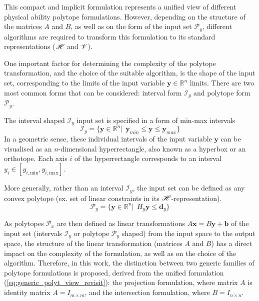 This compact and implicit formulation represents a unified view of different physical ability polytope formulations. However, depending on the structure of the matrices $A$ and $B$, as well as on the form of the input set $\mathcal{P}_y$, different algorithms are required to transform this formulation to its standard representations ($\mathscr{H}$ and $\mathscr{V}$). 

One important factor for determining the complexity of the polytope transformation, and the choice of the suitable algorithm, is the shape of the input set, corresponding to the limits of the input variable $\bm{y}\in\mathbb{R}^n$ limits. There are two most common forms that can be considered: interval form $\mathcal{I}_y$ and polytope form $\mathcal{P}_y$. 

The interval shaped $\mathcal{I}_y$ input set is specified in a form of min-max intervals
\begin{equation}
    \mathcal{I}_y = \{\bm{y}\in \mathbb{R}^n |~~ \bm{y}_{min} \leq \bm{y}\leq \bm{y}_{max} \}
    \label{eq:hypercube_lim}
\end{equation}
In a geometric sense, these individual intervals of the input variable $\bm{y}$ can be visualised as an $n$-dimensional hyperrectangle, also known as a hyperbox or an orthotope. Each axis $i$ of the hyperrectangle corresponds to an interval $y_i\in[y_{i,\text{min}},y_{i,\text{max}}]$.

More generally, rather than an interval $\mathcal{I}_y$, the input set can be defined as any convex polytope (ex. set of linear constraints in its $\mathscr{H}$-representation).
\begin{equation}
    \mathcal{P}_y = \{\bm{y}\in \mathbb{R}^n|~~ H_y\bm{y}\leq \bm{d}_y \}
\end{equation}

As polytopes $\mathcal{P}_x$ are then defined as linear transformations $A\bm{x}\!=\!B\bm{y}\! +\! \bm{b}$ of the input set (intervals $\mathcal{I}_y$ or polytope $\mathcal{P}_y$ shaped) from the input space to the output space, the structure of the linear transformation (matrices $A$ and $B$) has a direct impact on the complexity of the formulation, as well as on the choice of the algorithm.
Therefore, in this work, the distinction between two generic families of polytope formulations is proposed, derived from the unified formulation (\ref{eq:generic_polyt_view_revisit}): the projection formulation, where matrix $A$ is identity matrix $A=I_{m\times m}$, and the intersection formulation, where 
$B=I_{n\times n}$.

